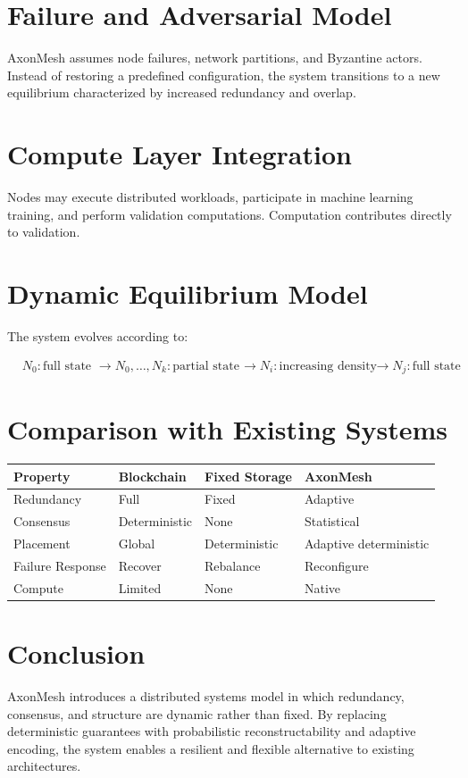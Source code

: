 \documentclass[11pt]{article}
\begin{document}
\section{Failure and Adversarial Model}

AxonMesh assumes node failures, network partitions, and Byzantine actors. Instead of restoring a predefined configuration, the system transitions to a new equilibrium characterized by increased redundancy and overlap.

\section{Compute Layer Integration}

Nodes may execute distributed workloads, participate in machine learning training, and perform validation computations. Computation contributes directly to validation.

\section{Dynamic Equilibrium Model}

The system evolves according to:

\[
\begin{aligned}
& { N_0 : \text{full state} } \
& \rightarrow { N_0, \dots, N_k : \text{partial state} } \
& \rightarrow { N_i : \text{increasing density} } \
& \rightarrow { N_j : \text{full state} }
\end{aligned}
\]

\section{Comparison with Existing Systems}

\begin{center}
\begin{tabular}{llll}
\toprule
Property & Blockchain & Fixed Storage & AxonMesh \\
\midrule
Redundancy & Full & Fixed & Adaptive \\
Consensus & Deterministic & None & Statistical \\
Placement & Global & Deterministic & Adaptive deterministic \\
Failure Response & Recover & Rebalance & Reconfigure \\
Compute & Limited & None & Native \\
\bottomrule
\end{tabular}
\end{center}

\section{Conclusion}

AxonMesh introduces a distributed systems model in which redundancy, consensus, and structure are dynamic rather than fixed. By replacing deterministic guarantees with probabilistic reconstructability and adaptive encoding, the system enables a resilient and flexible alternative to existing architectures.
\end{document}
